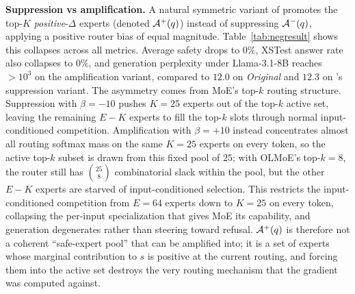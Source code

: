 \begin{table}
\vspace{-1em}

\vspace{-1em}
\end{table}

\noindent\textbf{Suppression vs amplification.}
A natural symmetric variant of \name promotes the top-$K$ \emph{positive}-$\Delta$ experts (denoted ${\mathcal{A}^{+}}(q)$) instead of suppressing ${\mathcal{A}^{-}}(q)$, applying a positive router bias of equal magnitude. Table~\ref{tab:negresult} shows this collapses across all metrics. Average safety drops to $0\%$, XSTest answer rate also collapses to $0\%$, and generation perplexity under Llama-3.1-8B reaches $>10^{3}$ on the amplification variant, compared to $12.0$ on \textit{Original} and $12.3$ on \name's suppression variant. The asymmetry comes from MoE's top-$k$ routing structure. Suppression with $\beta=-10$ pushes $K{=}25$ experts out of the top-$k$ active set, leaving the remaining $E-K$ experts to fill the top-$k$ slots through normal input-conditioned competition. Amplification with $\beta=+10$ instead concentrates almost all routing softmax mass on the same $K{=}25$ experts on every token, so the active top-$k$ subset is drawn from this fixed pool of $25$; with OLMoE's top-$k = 8$, the router still has $\binom{25}{8}$ combinatorial slack within the pool, but the other $E-K$ experts are starved of input-conditioned selection. This restricts the input-conditioned competition from $E = 64$ experts down to $K = 25$ on every token, collapsing the per-input specialization that gives MoE its capability, and generation degenerates rather than steering toward refusal. ${\mathcal{A}^{+}}(q)$ is therefore not a coherent ``safe-expert pool'' that can be amplified into; it is a set of experts whose marginal contribution to $s$ is positive at the current routing, and forcing them into the active set destroys the very routing mechanism that the gradient was computed against.